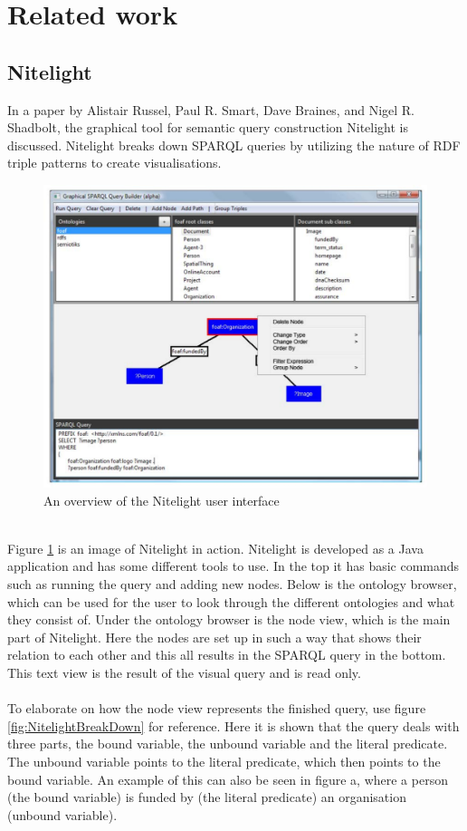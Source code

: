 \section{Related work}
\subsection{Nitelight}
In a paper by Alistair Russel, Paul R. Smart, Dave Braines, and Nigel R. Shadbolt\cite{Nitelight}, the graphical tool for semantic query construction Nitelight is discussed. Nitelight breaks down SPARQL queries  by utilizing the nature of RDF triple patterns to create visualisations. 
\begin{figure}[h]
    \centering
  \includegraphics[width=.9\linewidth]{NitelightFigure1.pdf}
  \caption{An overview of the Nitelight user interface\cite{Nitelight}}
  \label{fig:NitelightUI}
\end{figure}
\\
Figure \ref{fig:NitelightUI} is an image of Nitelight in action. Nitelight is developed as a Java application and has some different tools to use. In the top it has basic commands such as running the query and adding new nodes. Below is the ontology browser, which can be used for the user to look through the different ontologies and what they consist of. Under the ontology browser is the node view, which is the main part of Nitelight. Here the nodes are set up in such a way that shows their relation to each other and this all results in the SPARQL query in the bottom. This text view is the result of the visual query and is read only.
\\\\
To elaborate on how the node view represents the finished query, use figure \ref{fig:NitelightBreakDown} for reference. Here it is shown that the query deals with three parts, the bound variable, the unbound variable and the literal predicate. The unbound variable points to the literal predicate, which then points to the bound variable. An example of this can also be seen in figure a, where a person (the bound variable) is funded by (the literal predicate) an organisation (unbound variable).

